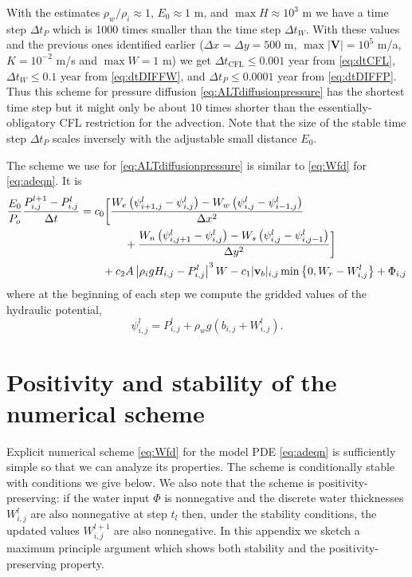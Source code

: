 \documentclass[12pt,final]{amsart}%
\newcommand\bv{\mathbf{v}}
\newcommand\bV{\mathbf{V}}
\newcommand{\Wlij}{W^l_{i,j}}
\newcommand{\Plij}{P^l_{i,j}}
\begin{document}
With the estimates $\rho_w/\rho_i \approx 1$, $E_0\approx 1$ m, and $\max H \approx 10^3$ m we have a time step $\Delta t_P$ which is 1000 times smaller than the time step $\Delta t_W$.  With these values and the previous ones identified earlier ($\Delta x = \Delta y = 500$ m, $\max |\bV|=10^5$ m/a, $K=10^{-2}$ m/s and $\max W=1$ m) we get $\Delta t_{\text{CFL}} \le 0.001$ year from \eqref{eq:dtCFL}, $\Delta t_W \le 0.1$ year from \eqref{eq:dtDIFFW}, and $\Delta t_P \le 0.0001$ year from \eqref{eq:dtDIFFP}.  Thus this scheme for pressure diffusion \eqref{eq:ALTdiffusionpressure} has the shortest time step but it might only be about 10 times shorter than the essentially-obligatory CFL restriction for the advection.  Note that the size of the stable time step $\Delta t_P$ scales inversely with the adjustable small distance $E_0$.

The scheme we use for \eqref{eq:ALTdiffusionpressure} is similar to \eqref{eq:Wfd} for \eqref{eq:adeqn}.  It is
\begin{align}
\frac{E_0}{P_o} \frac{P_{i,j}^{l+1} - \Plij}{\Delta t} &= c_0 \bigg[\frac{W_e \left(\psi_{i+1,j}^l - \psi_{i,j}^l\right) - W_w \left(\psi_{i,j}^l - \psi_{i-1,j}^l\right)}{\Delta x^2}  \label{eq:Pfd} \\
      &\qquad\qquad + \frac{W_n \left(\psi_{i,j+1}^l - \psi_{i,j}^l\right) - W_s \left(\psi_{i,j}^l - \psi_{i,j-1}^l\right)}{\Delta y^2}\bigg] \notag \\
      &\qquad + c_2 A \left|\rho_i g H_{i,j} - \Plij\right|^3 W - c_1 |\bv_b|_{i,j} \min\left\{0,W_r - \Wlij\right\} + \Phi_{i,j} \notag
\end{align}
where at the beginning of each step we compute the gridded values of the hydraulic potential,
	$$\psi_{i,j}^l = \Plij + \rho_w g(b_{i,j} + \Wlij).$$


\small



\small
\appendix

\section{Positivity and stability of the numerical scheme}

Explicit numerical scheme \eqref{eq:Wfd} for the model PDE \eqref{eq:adeqn} is sufficiently simple so that we can analyze its properties.  The scheme is conditionally stable with conditions we give below.  We also note that the scheme is positivity-preserving: if the water input $\Phi$ is nonnegative and the discrete water thicknesses $\Wlij$ are also nonnegative at step $t_l$ then, under the stability conditions, the updated values $W_{i,j}^{l+1}$ are also nonnegative.  In this appendix we sketch a maximum principle argument \citep{MortonMayers} which shows both stability and the positivity-preserving property.
\end{document}
